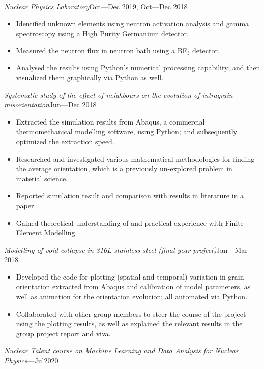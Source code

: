 \documentclass[a4paper, 12pt]{article}
\newcommand{\expentry}[3]{\emph{#1}\hfill{#2}---{#3}}
\begin{document}
\expentry{Nuclear Physics Laboratory}{Oct}{Dec 2019, Oct---Dec 2018}
    \begin{itemize}
    \setlength\itemsep{0em}
    \item Identified unknown elements using neutron activation analysis and gamma spectroscopy using a High Purity Germanium detector.
    \item Measured the neutron flux in neutron bath using a BF$_3$ detector.
    \item Analysed the results using Python’s numerical processing capability; and then visualized them graphically via Python as well.
    \end{itemize}
\begin{adjustwidth}{-0.5cm}{-1.2cm} %
\expentry{Systematic study of the effect of neighbours on the evolution of intragrain misorientation}{Jun}{Dec 2018}
\end{adjustwidth}
    \begin{itemize}
    \setlength\itemsep{0em}
    \item Extracted the simulation results from Abaqus, a commercial thermomechanical modelling software, using Python; and subsequently optimized the extraction speed.
    \item Researched and investigated various mathematical methodologies for finding the average orientation, which is a previously un-explored problem in material science.
    \item Reported simulation result and comparison with results in literature in a paper.
    \item Gained theoretical understanding of and practical experience with Finite Element Modelling.
    \end{itemize}
\expentry{Modelling of void collapse in 316L stainless steel (final year project)}{Jan}{Mar 2018}
    \begin{itemize}
    \setlength\itemsep{0em}
    \item Developed the code for plotting (spatial and temporal) variation in grain orientation extracted from Abaqus and calibration of model parameters, as well as animation for the orientation evolution; all automated via Python.
    \item Collaborated with other group members to steer the course of the project using the plotting results, as well as explained the relevant results in the group project report and viva.
    \end{itemize}
\expentry{Nuclear Talent course on Machine Learning and Data Analysis for Nuclear Physics}{}{Jul2020}
\end{document}
